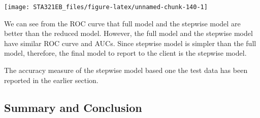 \documentclass[
]{book}
\newenvironment{Shaded}{\begin{snugshade}}{\end{snugshade}}
\newcommand{\AttributeTok}[1]{\textcolor[rgb]{0.13,0.29,0.53}{#1}}
\newcommand{\DecValTok}[1]{\textcolor[rgb]{0.00,0.00,0.81}{#1}}
\newcommand{\DocumentationTok}[1]{\textcolor[rgb]{0.56,0.35,0.01}{\textbf{\textit{#1}}}}
\newcommand{\FloatTok}[1]{\textcolor[rgb]{0.00,0.00,0.81}{#1}}
\newcommand{\FunctionTok}[1]{\textcolor[rgb]{0.13,0.29,0.53}{\textbf{#1}}}
\newcommand{\NormalTok}[1]{#1}
\newcommand{\OtherTok}[1]{\textcolor[rgb]{0.56,0.35,0.01}{#1}}
\newcommand{\SpecialCharTok}[1]{\textcolor[rgb]{0.81,0.36,0.00}{\textbf{#1}}}
\newcommand{\StringTok}[1]{\textcolor[rgb]{0.31,0.60,0.02}{#1}}
\begin{document}
\begin{Shaded}
\end{Shaded}

\begin{center}\texttt{[image: STA321EB\_files/figure-latex/unnamed-chunk-140-1]} \end{center}

We can see from the ROC curve that full model and the stepwise model are better than the reduced model. However, the full model and the stepwise model have similar ROC curve and AUCs. Since stepwise model is simpler than the full model, therefore, the final model to report to the client is the stepwise model.

The accuracy measure of the stepwise model based one the test data has been reported in the earlier section.

\hypertarget{summary-and-conclusion-1}{%
\subsection{Summary and Conclusion}\label{summary-and-conclusion-1}}
\end{document}
